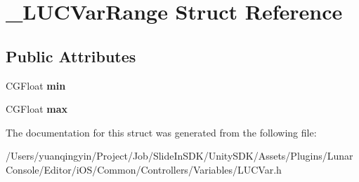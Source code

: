 \hypertarget{struct___l_u_c_var_range}{}\section{\+\_\+\+L\+U\+C\+Var\+Range Struct Reference}
\label{struct___l_u_c_var_range}
\subsection*{Public Attributes}
\begin{DoxyCompactItemize}
\item 
\mbox{\label{struct___l_u_c_var_range_abe11377395be7ef1c1cf556cf6896ebd}} 
C\+G\+Float {\bfseries min}
\item 
\mbox{\label{struct___l_u_c_var_range_adf994fc3ed8c97c3a6cc825b4f7049c8}} 
C\+G\+Float {\bfseries max}
\end{DoxyCompactItemize}


The documentation for this struct was generated from the following file\+:\begin{DoxyCompactItemize}
\item 
/\+Users/yuanqingyin/\+Project/\+Job/\+Slide\+In\+S\+D\+K/\+Unity\+S\+D\+K/\+Assets/\+Plugins/\+Lunar\+Console/\+Editor/i\+O\+S/\+Common/\+Controllers/\+Variables/L\+U\+C\+Var.\+h\end{DoxyCompactItemize}
